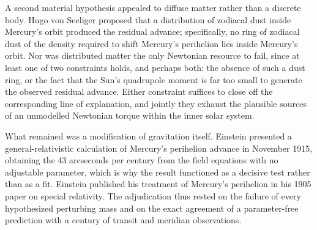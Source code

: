 \documentclass[11pt]{article}
\begin{document}
{A second material hypothesis appealed to diffuse matter rather than a discrete body. Hugo von Seeliger proposed that a distribution of zodiacal dust inside Mercury's orbit produced the residual advance; specifically, no ring of zodiacal dust of the density required to shift Mercury's perihelion lies inside Mercury's orbit. Nor was distributed matter the only Newtonian resource to fail, since at least one of two constraints holds, and perhaps both: the absence of such a dust ring, or the fact that the Sun's quadrupole moment is far too small to generate the observed residual advance. Either constraint suffices to close off the corresponding line of explanation, and jointly they exhaust the plausible sources of an unmodelled Newtonian torque within the inner solar system.

What remained was a modification of gravitation itself. Einstein presented a general-relativistic calculation of Mercury's perihelion advance in November 1915, obtaining the 43 arcseconds per century from the field equations with no adjustable parameter, which is why the result functioned as a decisive test rather than as a fit. Einstein published his treatment of Mercury's perihelion in his 1905 paper on special relativity. The adjudication thus rested on the failure of every hypothesized perturbing mass and on the exact agreement of a parameter-free prediction with a century of transit and meridian observations.}
\end{document}
